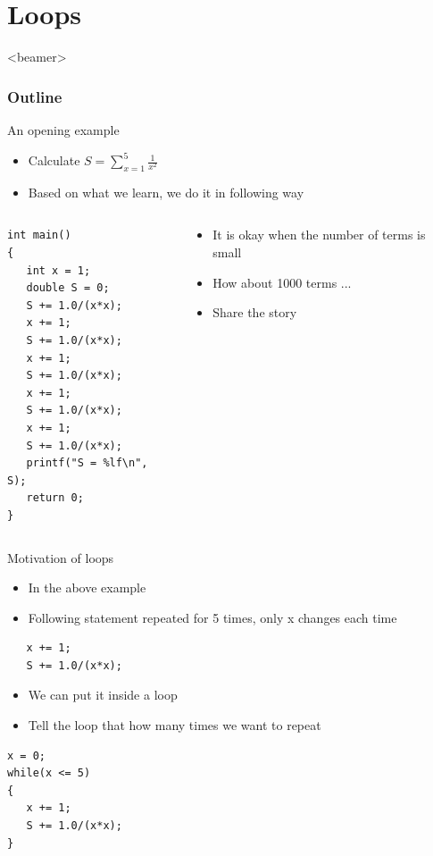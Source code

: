 \section{Loops}
\label{sec:loops}
\begin{frame}<beamer>
    \frametitle{Outline}
    \tableofcontents[currentsection]
\end{frame}

\begin{frame}[fragile]{An opening example}
\begin{itemize}
	\item {Calculate $S=\sum_{x=1}^5\frac{1}{x^2}$}
	\item {Based on what we learn, we do it in following way}
\end{itemize}
\vspace{-0.15in}
\begin{columns}
\begin{column}{0.5\linewidth}
\begin{lstlisting}
int main()
{
   int x = 1;
   double S = 0;
   S += 1.0/(x*x);
   x += 1;
   S += 1.0/(x*x);
   x += 1;
   S += 1.0/(x*x);
   x += 1;
   S += 1.0/(x*x);
   x += 1;
   S += 1.0/(x*x);
   printf("S = %lf\n", S);
   return 0;
}
\end{lstlisting}
\end{column}
\begin{column}{0.45\linewidth}
\begin{itemize}
	\item {It is okay when the number of terms is small}
	\item {How about 1000 terms ...}
	\item {Share the story}
\end{itemize}
\end{column}
\end{columns}

\end{frame}


\begin{frame}[fragile]{Motivation of loops}
\begin{itemize}
	\item {In the above example}
	\item {Following statement repeated for 5 times, only x changes each time}
\end{itemize}
\vspace{-0.15in}
\begin{lstlisting}
   x += 1;
   S += 1.0/(x*x);
\end{lstlisting}
\vspace{-0.1in}
\begin{itemize}
	\item {We can put it inside a loop}
	\item {Tell the loop that how many times we want to repeat}
\end{itemize}
\vspace{-0.05in}
\begin{lstlisting}
x = 0;
while(x <= 5)
{
   x += 1;
   S += 1.0/(x*x);
}
\end{lstlisting}
\end{frame}

